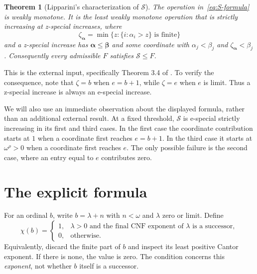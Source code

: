 \documentclass[11pt,letterpaper]{article}
\newtheorem{theorem}{Theorem}[section]
\theoremstyle{definition}
\theoremstyle{remark}
\newcommand{\Sop}{\mathcal S}
\newcommand{\seq}[1]{\boldsymbol{#1}}
\newcommand{\chip}{\chi}
\begin{document}
\begin{theorem}[Lipparini's characterization of $\Sop$]\label{thm:known}
The operation in~\eqref{eq:S-formula} is weakly monotone. It is the least weakly monotone operation that is strictly increasing at z-special increases, where
\[
 \zeta_{\seq\alpha}=\min\{z:\{i:\alpha_i>z\}\text{ is finite}\}
\]
and a z-special increase has $\seq\alpha\le\seq\beta$ and some coordinate with $\alpha_j<\beta_j$ and $\zeta_{\seq\alpha}<\beta_j$. Consequently every admissible $F$ satisfies $\Sop\le F$.
\end{theorem}

This is the external input, specifically Theorem 3.4 of \cite{Lip26}. To verify the consequence, note that $\zeta=b$ when $e=b+1$, while $\zeta=e$ when $e$ is limit. Thus a z-special increase is always an e-special increase.

We will also use an immediate observation about the displayed formula, rather than an additional external result. At a fixed threshold, $\Sop$ is e-special strictly increasing in its first and third cases. In the first case the coordinate contribution starts at $1$ when a coordinate first reaches $e=b+1$. In the third case it starts at $\omega^\rho>0$ when a coordinate first reaches $e$. The only possible failure is the second case, where an entry equal to $e$ contributes zero.

\section{The explicit formula}\label{sec:formula}

For an ordinal $b$, write $b=\lambda+n$ with $n<\omega$ and $\lambda$ zero or limit. Define
\begin{equation}\label{eq:chi}
 \chip(b)=
 \begin{cases}
 1,&\lambda>0\text{ and the final CNF exponent of }\lambda
       \text{ is a successor},\\
 0,&\text{otherwise}.
 \end{cases}
\end{equation}
Equivalently, discard the finite part of $b$ and inspect its least positive Cantor exponent. If there is none, the value is zero. The condition concerns this \emph{exponent}, not whether $b$ itself is a successor.
\end{document}

